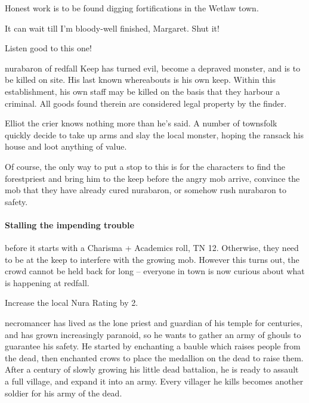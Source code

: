\begin{multicols}{2}
\begin{speechtext}
		Honest work is to be found digging fortifications in the Wetlaw town.

		It can wait till I'm bloody-well finished, Margaret.  Shut it!

		Listen good to this one!

		\gls{nurabaron} of \gls{redfall} Keep has turned evil, become a depraved monster, and is to be killed on site.  His last known whereabouts is his own keep.  Within this establishment, his own staff may be killed on the basis that they harbour a criminal.  All goods found therein are considered legal property by the finder.

\end{speechtext}

Elliot the crier knows nothing more than he's said.  A number of townsfolk quickly decide to take up arms and slay the local monster, hoping the ransack his house and loot anything of value.

Of course, the only way to put a stop to this is for the characters to find the \gls{forestpriest} and bring him to the keep before the angry mob arrive, convince the mob that they have already cured \gls{nurabaron}, or somehow rush \gls{nurabaron} to safety.

\paragraph{Stalling the impending trouble}
before it starts with a Charisma + Academics roll, TN 12.
Otherwise, they need to be at the keep to interfere with the growing mob.
However this turns out, the crowd cannot be held back for long -- everyone in \gls{town} is now curious about what is happening at \gls{redfall}.

Increase the local Nura Rating by 2.

\stopcontents[sq]

\resumecontents[Forest]

\label{necromancerspet}

\stopcontents[Forest]

\startcontents[sq]

\sqminitoc

\noindent
\Gls{necromancer} has lived as the lone priest and guardian of his temple for centuries, and has grown increasingly paranoid, so he wants to gather an army of ghouls to guarantee his safety.
He started by enchanting a bauble which raises people from the dead, then enchanted crows to place the medallion on the dead to raise them.
After a century of slowly growing his little dead battalion, he is ready to assault a full village, and expand it into an army.
Every villager he kills becomes another soldier for his army of the dead.


\end{multicols}

